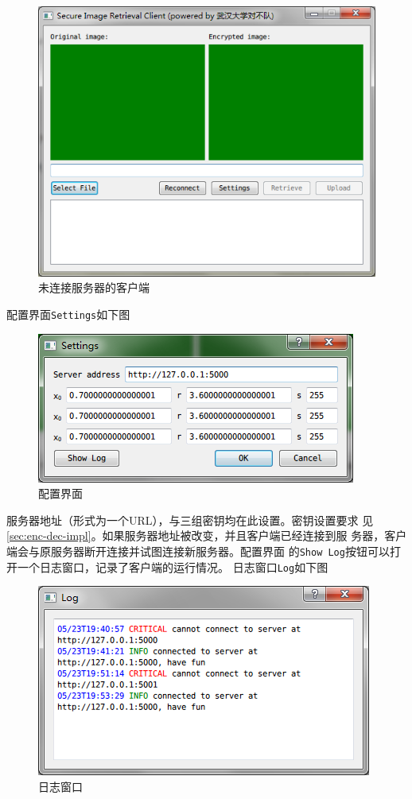 \begin{figure}[H]
  \centering
  \includegraphics[keepaspectratio=true]{images/ui-disconnected.png}
  \caption{未连接服务器的客户端}
  \label{fig:ui-disconnected}
\end{figure}

配置界面\texttt{Settings}如下图

\begin{figure}[H]
  \centering
  \includegraphics[keepaspectratio=true]{images/ui-settings-dialog.png}
  \caption{配置界面}
  \label{fig:ui-settings-dialog}
\end{figure}

服务器地址（形式为一个URL），与三组密钥均在此设置。密钥设置要求
见\ref{sec:enc-dec-impl}。如果服务器地址被改变，并且客户端已经连接到服
务器，客户端会与原服务器断开连接并试图连接新服务器。配置界面
的\texttt{Show Log}按钮可以打开一个日志窗口，记录了客户端的运行情况。
日志窗口\texttt{Log}如下图

\begin{figure}[H]
  \centering
  \includegraphics[keepaspectratio=true]{images/ui-log-dialog.png}
  \caption{日志窗口}
  \label{fig:ui-log-dialog}
\end{figure}

